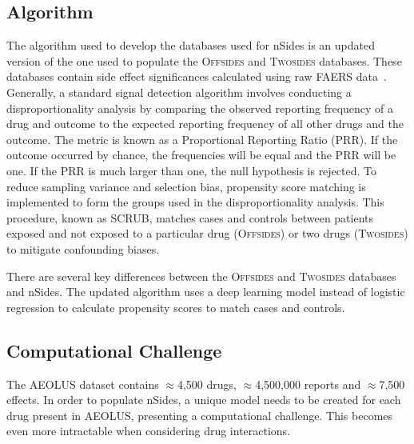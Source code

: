 \documentclass{ws-procs11x85}
\begin{document}
\subsection{Algorithm}
The algorithm used to develop the databases used for nSides is an
updated version of the one used to populate the O\textsc{ffsides} and
T\textsc{wosides} databases.  These databases contain side effect
significances calculated using raw FAERS data~\cite{Tatonetti2012}.
Generally, a standard signal detection algorithm involves conducting a
disproportionality analysis by comparing the observed reporting
frequency of a drug and outcome to the expected reporting frequency of
all other drugs and the outcome. The metric is known as a Proportional
Reporting Ratio (PRR). If the outcome occurred by chance, the
frequencies will be equal and the PRR will be one. If the PRR is much
larger than one, the null hypothesis is rejected. To reduce sampling
variance and selection bias, propensity score matching is implemented
to form the groups used in the disproportionality analysis. This
procedure, known as SCRUB, matches cases and controls between patients
exposed and not exposed to a particular drug (O\textsc{ffsides}) or
two drugs (T\textsc{wosides}) to mitigate confounding biases.

There are several key differences between the O\textsc{ffsides} and
T\textsc{wosides} databases and nSides. The updated algorithm uses a
deep learning model instead of logistic regression to calculate
propensity scores to match cases and controls.

\subsection{Computational Challenge}

The AEOLUS dataset contains $\approx$4,500 drugs, $\approx$4,500,000
reports and $\approx$7,500 effects. In order to populate nSides, a
unique model needs to be created for each drug present in AEOLUS,
presenting a computational challenge.  This becomes even more
intractable when considering drug interactions.





\end{document}
